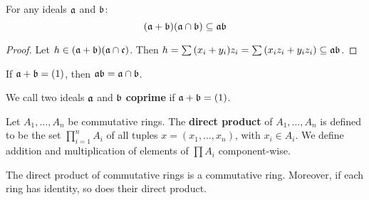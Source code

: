 \begin{theorem}\label{theorem_5.5.9}
  For any ideals $\af$ and $\bf$:
  \begin{equation}
    (\af+\bf)(\af \cap \bf) \subseteq \af\bf
  \end{equation}
\end{theorem}
\begin{proof}
  Let $h \in (\af+\bf)(\af \cap \cf)$. Then $h=\sum{(x_i+y_i)z_i}=
  \sum{(x_iz_i+y_iz_i)} \subseteq \af\bf$.
\end{proof}
\begin{corollary}
  If $\af+\bf=(1)$, then $\af\bf=\af \cap \bf$.
\end{corollary}

\begin{definition}
  We call two ideals $\af$ and  $\bf$  \textbf{coprime} if $\af+\bf=(1)$.
\end{definition}

\begin{definition}
  Let $A_1, \dots, A_n$ be commutative rings. The \textbf{direct product} of
  $A_1, \dots, A_n$ is defined to be the set $\prod_{i=1}^n{A_i}$ of all tuples
  $x=(x_1, \dots, x_n)$, with $x_i \in A_i$. We define addition and
  multiplication of elements of $\prod{A_i}$ component-wise.
\end{definition}

\begin{lemma}\label{lemma_5.5.10}
  The direct product of commutative rings is a commutative ring. Moreover, if
  each ring has identity, so does their direct product.
\end{lemma}

